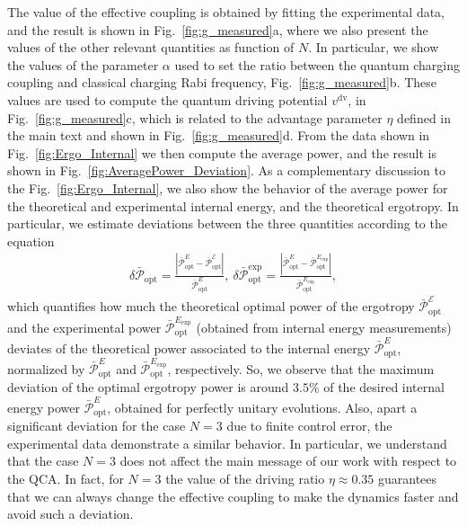 \documentclass[aps,prl,epsfigure,twocolumn,superscriptaddress]{revtex4-2}
\newcommand{\Ecal}{\mathcal{E}}
\newcommand{\Pcal}{\mathcal{P}}
\newcommand{\1}{\mathbbm{1}}
\newcommand{\SubFig}[2]{\ref{#1}{\color{blue}#2}}
\newcommand{\RefA}[1]{{\color{black}#1}}
\begin{document}
The value of the effective coupling is obtained by fitting the experimental data, and the result is shown in Fig.~\SubFig{fig:g_measured}{a}, where we also present the values of the other relevant quantities as function of $N$. In particular, we show the values of the parameter $\alpha$ used to set the ratio between the quantum charging coupling and classical charging Rabi frequency, Fig.~\SubFig{fig:g_measured}{b}. These values are used to compute the quantum driving potential $v^\mathrm{dv}$, in Fig.~\SubFig{fig:g_measured}{c}, which is related to the advantage parameter $\eta$ defined in the main text and shown in Fig.~\SubFig{fig:g_measured}{d}. From the data shown in Fig.~\ref{fig:Ergo_Internal} we then compute the average power, and the result is shown in Fig.~\ref{fig:AveragePower_Deviation}. As a complementary discussion to the Fig.~\ref{fig:Ergo_Internal}, we also show the behavior of the average power for the theoretical and experimental internal energy, and the theoretical ergotropy. In particular, we estimate deviations between the three quantities according to the equation\RefA{
	\begin{align}
		\delta \bar{\Pcal}_{\mathrm{opt}} = \frac{|\bar{\Pcal}_{\mathrm{opt}}^{E} - \bar{\Pcal}_{\mathrm{opt}}^{\Ecal}|}{\bar{\Pcal}_{\mathrm{opt}}^{E}}, ~
		\delta \bar{\Pcal}_{\mathrm{opt}}^{{\mathrm{exp}}} = \frac{|\bar{\Pcal}_{\mathrm{opt}}^{E} - \bar{\Pcal}_{\mathrm{opt}}^{E_\mathrm{exp}}|}{\bar{\Pcal}_{\mathrm{opt}}^{E_\mathrm{exp}}} ,
	\end{align}
	which quantifies how much the theoretical optimal power of the ergotropy $\bar{\Pcal}_{\mathrm{opt}}^{\Ecal}$ and the experimental power $\bar{\Pcal}_{\mathrm{opt}}^{E_\mathrm{exp}}$ (obtained from internal energy measurements) deviates of the theoretical power associated to the internal energy $\bar{\Pcal}_{\mathrm{opt}}^{E}$, normalized by $\bar{\Pcal}_{\mathrm{opt}}^{E}$ and $\bar{\Pcal}_{\mathrm{opt}}^{E_\mathrm{exp}}$, respectively}. So, we observe that the maximum deviation of the optimal ergotropy power is around $3.5\%$ of the desired internal energy power $\bar{\Pcal}_{\mathrm{opt}}^{E}$, obtained for perfectly unitary evolutions. Also, apart a significant deviation for the case $N=3$ due to finite control error, the experimental data demonstrate a similar behavior. In particular, we understand that the case $N=3$ does not affect the main message of our work with respect to the QCA. In fact, for $N=3$ the value of the driving ratio $\eta\approx 0.35$ guarantees that we can always change the effective coupling to make the dynamics faster and avoid such a deviation.
\end{document}
